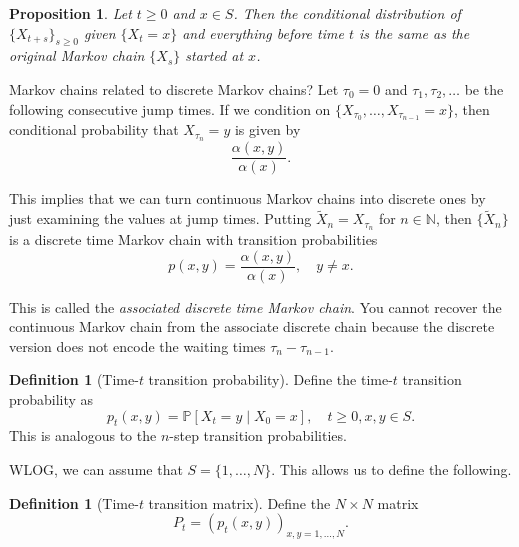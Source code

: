 \documentclass{tufte-handout}
\newcommand*\N{\mathbb{N}}
\renewcommand*\P{\mathbb{P}}
\newtheorem{prop}[thm]{Proposition}
\theoremstyle{definition}
\newtheorem{defn}[thm]{Definition}
\begin{document}
\begin{prop}
	Let $t \ge 0$ and $x \in S$. Then the conditional distribution of $\{X_{t+s}\}_{s\ge 0}$ given $\{X_t = x\}$ and everything before time $t$ is the same as the original Markov chain $\{X_s\}$ started at $x$.
\end{prop}

 Markov chains related to discrete Markov chains? Let $\tau_0 = 0$ and $\tau_1,\tau_2,\ldots$ be the following consecutive jump times. If we condition on $\{X_{\tau_0},\ldots,X_{\tau_{n-1}} = x\}$, then conditional probability that $X_{\tau_n} = y$ is given by \[
	\frac{\alpha(x,y)}{\alpha(x)}
.\] 

This implies that we can turn continuous Markov chains into discrete ones by just examining the values at jump times. Putting $\tilde{X}_n = X_{\tau_n}$ for $n \in \N$, then $\{\tilde{X}_n\}$ is a discrete time Markov chain with transition probabilities \[
	p(x,y) = \frac{\alpha(x,y)}{\alpha(x)}, \quad y \ne x
.\] 

This is called the \emph{associated discrete time Markov chain}. You cannot recover the continuous Markov chain from the associate discrete chain because the discrete version does not encode the waiting times $\tau_n - \tau_{n-1}$.

\begin{defn}[Time-$t$ transition probability]
	Define the time-$t$ transition probability as \[
		p_t(x,y) = \P\left[X_t = y \mid X_0= x\right] , \quad t \ge 0, x,y \in S
	.\] This is analogous to the $n$-step transition probabilities. 
\end{defn}
WLOG, we can assume that $S = \{1,\ldots,N\}$.
This allows us to define the following.

\begin{defn}[Time-$t$ transition matrix]
	Define the $N \times N$ matrix \[
		P_t = \left( p_t(x,y) \right)_{x,y = 1,\ldots,N}
	.\] 
\end{defn}
\end{document}

